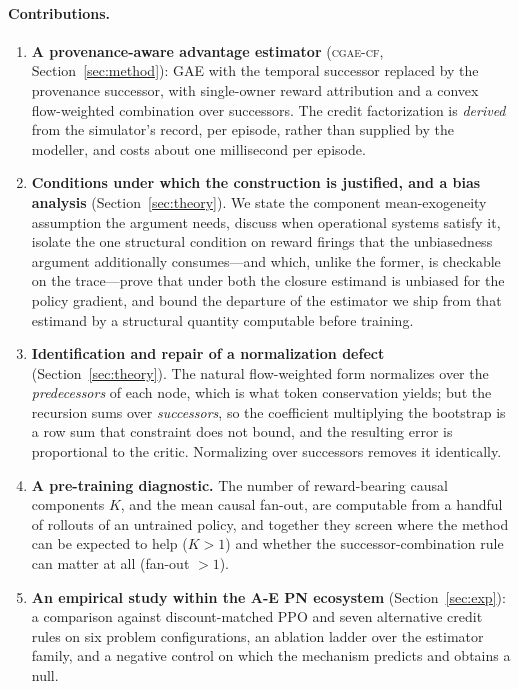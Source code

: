 \documentclass[review,authoryear,3p,times]{elsarticle}
\newcommand{\cflow}{\textsc{cgae-cf}}          %
\begin{document}
\paragraph{Contributions.}
\begin{enumerate}
\item \textbf{A provenance-aware advantage estimator} (\cflow,
Section~\ref{sec:method}): GAE with the temporal successor replaced by the
provenance successor, with single-owner reward attribution and a convex
flow-weighted combination over successors. The credit factorization is
\emph{derived} from the simulator's record, per episode, rather than supplied by
the modeller, and costs about one millisecond per episode.

\item \textbf{Conditions under which the construction is justified, and a bias
analysis} (Section~\ref{sec:theory}). We state the component mean-exogeneity
assumption the argument needs, discuss when operational systems satisfy it,
isolate the one structural condition on reward firings that the unbiasedness
argument additionally consumes---and which, unlike the former, is checkable on
the trace---prove that under both the closure estimand is unbiased for the
policy gradient,
and bound the departure of the estimator we ship from that estimand by a
structural quantity computable before training.

\item \textbf{Identification and repair of a normalization defect}
(Section~\ref{sec:theory}). The natural flow-weighted form normalizes over the
\emph{predecessors} of each node, which is what token conservation yields; but
the recursion sums over \emph{successors}, so the coefficient multiplying the
bootstrap is a row sum that constraint does not bound, and the resulting error
is proportional to the critic. Normalizing over successors removes it
identically.

\item \textbf{A pre-training diagnostic.} The number of reward-bearing causal
components $K$, and the mean causal fan-out, are computable from a handful of
rollouts of an untrained policy, and together they screen where the method can
be expected to help ($K>1$) and whether the successor-combination rule can
matter at all (fan-out $>1$).

\item \textbf{An empirical study within the A-E PN ecosystem}
(Section~\ref{sec:exp}): a comparison against discount-matched PPO and seven
alternative credit rules on six problem configurations, an ablation ladder over
the estimator family, and a negative control on which the mechanism predicts and
obtains a null.
\end{enumerate}
\end{document}
